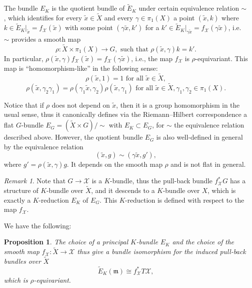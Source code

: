 \documentclass[oneside,11pt]{amsart}
\newtheorem{prop}[thm]{Proposition}
\theoremstyle{definition}
\theoremstyle{remark}
\newtheorem{rem}[thm]{Remark}
\numberwithin{thm}{section}
\numberwithin{equation}{section}
\begin{document}
The bundle $E_K$ is the quotient bundle of $\tilde E_K$ under certain equivalence relation $\sim$, which identifies for every $\tilde x\in\tilde X$ and every $\gamma\in\pi_1(X)$ a point $(\tilde x,k)$ where $k\in \tilde E_K|_{\tilde x}=f_{\mathcal{X}}(\tilde{x})$ with some point $(\gamma \tilde x,k')$ for a $k'\in \tilde E_K|_{\gamma\tilde x}=f_{\mathcal{X}}(\gamma\tilde{x})$, i.e. $\sim$ provides a smooth map 
\begin{equation*}\label{hom_like_map}
\rho\colon\tilde X\times\pi_1(X)\to G,\text{ such that }\rho(\tilde x,\gamma)k=k'.
\end{equation*}
In particular, $\rho(\tilde x,\gamma)f_{\mathcal{X}}(\tilde{x})=f_{\mathcal{X}}(\gamma\tilde{x})$, i.e., the map $f_{\mathcal X}$ is $\rho$-equivariant. This map is ``homomorphism-like'' in the following sense: 
$$
\rho(\tilde x,1)=1\text{ for all }\tilde x\in\tilde X,
$$
$$
\rho(\tilde x,\gamma_2\gamma_1)=\rho(\gamma_1\tilde x,\gamma_2)\rho(\tilde x,\gamma_1)\text{ for all }\tilde x\in\tilde X, \gamma_1,\gamma_2\in \pi_1(X).
$$

Notice that if $\rho$ does not depend on $\tilde x$, then it is a group homomorphism in the usual sense, thus it canonically defines via the Riemann--Hilbert correspondence a flat $G$-bundle $E_G= (\tilde{X} \times G )/ \sim $ with $E_K \subset E_G$, for $\sim$ the equivalence relation described above. However, the quotient bundle $E_G$ is also well-defined in general by the equivalence relation 
\begin{equation}\label{equiv_rel_rho}(\tilde x,g)\sim (\gamma\tilde x, g'),
\end{equation}
where $g'=\rho(\tilde x,\gamma)g$. It depends on the smooth map $\rho$ and is not flat in general. 

\begin{rem}
Note that $G\to\mathcal{X}$ is a $K$-bundle, thus the pull-back bundle $f_{\mathcal{X}}^*G$ has a structure of $K$-bundle over $\tilde{X}$, and it descends to a $K$-bundle over $X$, which is exactly a $K$-reduction $E_K$ of $E_G$. This $K$-reduction is defined with respect to the map $f_{\mathcal{X}}$.
\end{rem}

We have the following: 

\begin{prop}\label{prop:General_def_G}
The choice of a principal $K$-bundle $E_K$ and the choice of the smooth map $f_{\mathcal X}\colon \tilde{X} \to \mathcal{X}$ thus give a bundle isomorphism for the induced pull-back bundles over $\tilde{X}$
\begin{equation}\label{ident_general_G}
\tilde{E}_K(\mathfrak{m}) \cong f^{*}_{\mathcal{X}} T\mathcal{X},
\end{equation}
which is $\rho$-equivariant. 
\end{prop}
\end{document}
